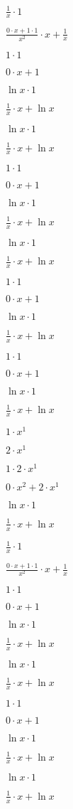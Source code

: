 $ \frac{1}{x}  \cdot 1$

$ \frac{0 \cdot x+1 \cdot 1}{x^{2}}  \cdot x+ \frac{1}{x} $

$1 \cdot 1$

$0 \cdot x+1$

$ \ln x \cdot 1$

$ \frac{1}{x}  \cdot x+ \ln x$

$ \ln x \cdot 1$

$ \frac{1}{x}  \cdot x+ \ln x$

$1 \cdot 1$

$0 \cdot x+1$

$ \ln x \cdot 1$

$ \frac{1}{x}  \cdot x+ \ln x$

$ \ln x \cdot 1$

$ \frac{1}{x}  \cdot x+ \ln x$

$1 \cdot 1$

$0 \cdot x+1$

$ \ln x \cdot 1$

$ \frac{1}{x}  \cdot x+ \ln x$

$1 \cdot 1$

$0 \cdot x+1$

$ \ln x \cdot 1$

$ \frac{1}{x}  \cdot x+ \ln x$

$1 \cdot x^{1}$

$2 \cdot x^{1}$

$1 \cdot 2 \cdot x^{1}$

$0 \cdot x^{2}+2 \cdot x^{1}$

$ \ln x \cdot 1$

$ \frac{1}{x}  \cdot x+ \ln x$

$ \frac{1}{x}  \cdot 1$

$ \frac{0 \cdot x+1 \cdot 1}{x^{2}}  \cdot x+ \frac{1}{x} $

$1 \cdot 1$

$0 \cdot x+1$

$ \ln x \cdot 1$

$ \frac{1}{x}  \cdot x+ \ln x$

$ \ln x \cdot 1$

$ \frac{1}{x}  \cdot x+ \ln x$

$1 \cdot 1$

$0 \cdot x+1$

$ \ln x \cdot 1$

$ \frac{1}{x}  \cdot x+ \ln x$

$ \ln x \cdot 1$

$ \frac{1}{x}  \cdot x+ \ln x$

